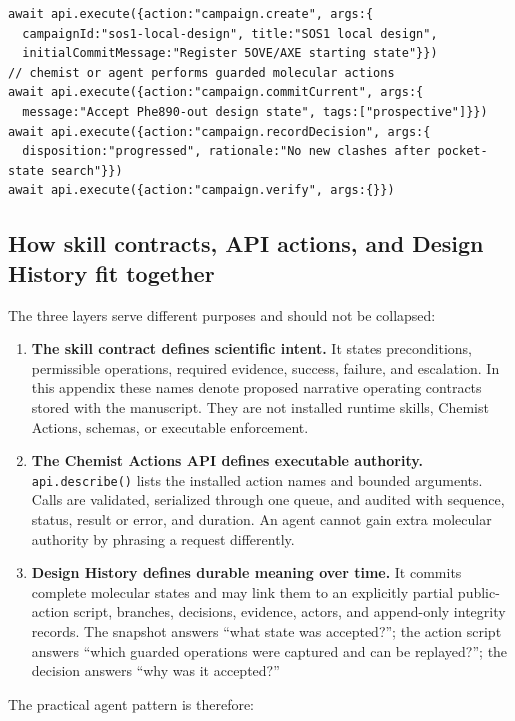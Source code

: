 \begin{small}
\begin{lstlisting}
await api.execute({action:"campaign.create", args:{
  campaignId:"sos1-local-design", title:"SOS1 local design",
  initialCommitMessage:"Register 5OVE/AXE starting state"}})
// chemist or agent performs guarded molecular actions
await api.execute({action:"campaign.commitCurrent", args:{
  message:"Accept Phe890-out design state", tags:["prospective"]}})
await api.execute({action:"campaign.recordDecision", args:{
  disposition:"progressed", rationale:"No new clashes after pocket-state search"}})
await api.execute({action:"campaign.verify", args:{}})
\end{lstlisting}

\subsection{How skill contracts, API actions, and Design History fit together}\label{appB:contractapi}

The three layers serve different purposes and should not be collapsed:

\begin{enumerate}[leftmargin=*]
\item \textbf{The skill contract defines scientific intent.} It states preconditions, permissible operations, required evidence, success, failure, and escalation. In this appendix these names denote proposed narrative operating contracts stored with the manuscript. They are not installed runtime skills, Chemist Actions, schemas, or executable enforcement.
\item \textbf{The Chemist Actions API defines executable authority.} \texttt{api.describe()} lists the installed action names and bounded arguments. Calls are validated, serialized through one queue, and audited with sequence, status, result or error, and duration. An agent cannot gain extra molecular authority by phrasing a request differently.
\item \textbf{Design History defines durable meaning over time.} It commits complete molecular states and may link them to an explicitly partial public-action script, branches, decisions, evidence, actors, and append-only integrity records. The snapshot answers ``what state was accepted?''; the action script answers ``which guarded operations were captured and can be replayed?''; the decision answers ``why was it accepted?''
\end{enumerate}

The practical agent pattern is therefore:


\end{small}
